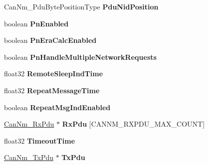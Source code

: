 \begin{DoxyCompactItemize}
\item 
Can\+Nm\+\_\+\+Pdu\+Byte\+Position\+Type {\bfseries Pdu\+Nid\+Position}\hypertarget{structCanNm__ChannelType_a162d415ab668ed1d0ca91db063c832a9}{}\label{structCanNm__ChannelType_a162d415ab668ed1d0ca91db063c832a9}

\item 
boolean {\bfseries Pn\+Enabled}\hypertarget{structCanNm__ChannelType_a8019cd367a918528bde8a3c0aa7fc77a}{}\label{structCanNm__ChannelType_a8019cd367a918528bde8a3c0aa7fc77a}

\item 
boolean {\bfseries Pn\+Era\+Calc\+Enabled}\hypertarget{structCanNm__ChannelType_aec1d55536050034f37cf9f33f1544bb8}{}\label{structCanNm__ChannelType_aec1d55536050034f37cf9f33f1544bb8}

\item 
boolean {\bfseries Pn\+Handle\+Multiple\+Network\+Requests}\hypertarget{structCanNm__ChannelType_ad1584f990be45d1b08175bde5ee8b503}{}\label{structCanNm__ChannelType_ad1584f990be45d1b08175bde5ee8b503}

\item 
float32 {\bfseries Remote\+Sleep\+Ind\+Time}\hypertarget{structCanNm__ChannelType_acd55d5131700e838d733ead525e62422}{}\label{structCanNm__ChannelType_acd55d5131700e838d733ead525e62422}

\item 
float32 {\bfseries Repeat\+Message\+Time}\hypertarget{structCanNm__ChannelType_a7810caef3f8328b38ddd3bb5fab03a02}{}\label{structCanNm__ChannelType_a7810caef3f8328b38ddd3bb5fab03a02}

\item 
boolean {\bfseries Repeat\+Msg\+Ind\+Enabled}\hypertarget{structCanNm__ChannelType_a90a238a27260484003da8f2bf1bae6f3}{}\label{structCanNm__ChannelType_a90a238a27260484003da8f2bf1bae6f3}

\item 
\hyperlink{structCanNm__RxPdu}{Can\+Nm\+\_\+\+Rx\+Pdu} $\ast$ {\bfseries Rx\+Pdu} \mbox{[}C\+A\+N\+N\+M\+\_\+\+R\+X\+P\+D\+U\+\_\+\+M\+A\+X\+\_\+\+C\+O\+U\+NT\mbox{]}\hypertarget{structCanNm__ChannelType_a25106182490a436b6f7b1cbaabace8f3}{}\label{structCanNm__ChannelType_a25106182490a436b6f7b1cbaabace8f3}

\item 
float32 {\bfseries Timeout\+Time}\hypertarget{structCanNm__ChannelType_af5c0cbf16cbd5a47b2a3e7c675a33956}{}\label{structCanNm__ChannelType_af5c0cbf16cbd5a47b2a3e7c675a33956}

\item 
\hyperlink{structCanNm__TxPdu}{Can\+Nm\+\_\+\+Tx\+Pdu} $\ast$ {\bfseries Tx\+Pdu}\hypertarget{structCanNm__ChannelType_afed541c2d716e0608c4336bdb3899820}{}\label{structCanNm__ChannelType_afed541c2d716e0608c4336bdb3899820}


\end{DoxyCompactItemize}
